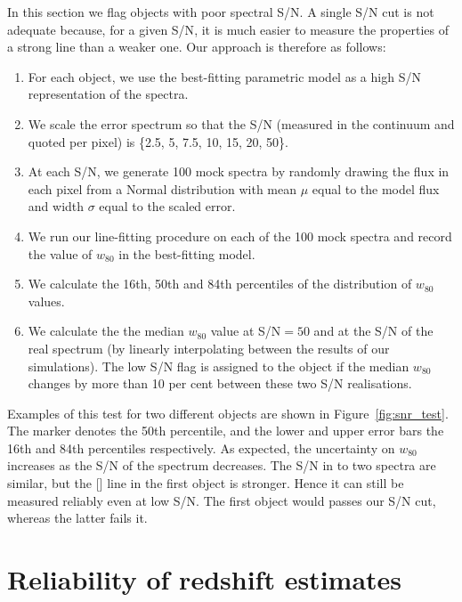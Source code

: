 In this section we flag objects with poor spectral \ac{S/N}. 
A single \ac{S/N} cut is not adequate because, for a given \ac{S/N}, it is much easier to measure the properties of a strong line than a weaker one. 
Our approach is therefore as follows:

\begin{enumerate}
\item For each object, we use the best-fitting parametric model as a high \ac{S/N} representation of the spectra. 
\item We scale the error spectrum so that the \ac{S/N} (measured in the continuum and quoted per pixel) is \{2.5, 5, 7.5, 10, 15, 20, 50\}.
\item At each \ac{S/N}, we generate 100 mock spectra by randomly drawing the flux in each pixel from a Normal distribution with mean $\mu$ equal to the model flux and width $\sigma$ equal to the scaled error. 
\item We run our line-fitting procedure on each of the 100 mock spectra and record the value of $w_{80}$ in the best-fitting model. 
\item We calculate the 16th, 50th and 84th percentiles of the distribution of $w_{80}$ values.
\item We calculate the the median $w_{80}$ value at \ac{S/N}$=50$ and at the \ac{S/N} of the real spectrum (by linearly interpolating between the results of our simulations). The low \ac{S/N} flag is assigned to the object if the median $w_{80}$ changes by more than 10 per cent between these two \ac{S/N} realisations. 
\end{enumerate}

Examples of this test for two different objects are shown in Figure~\ref{fig:snr_test}.
The marker denotes the 50th percentile, and the lower and upper error bars the 16th and 84th percentiles respectively. 
As expected, the uncertainty on $w_{80}$ increases as the \ac{S/N} of the spectrum decreases. 
The \ac{S/N} in to two spectra are similar, but the [] line in the  first object is stronger. 
Hence it can still be measured reliably even at low \ac{S/N}. 
The first object would passes our \ac{S/N} cut, whereas the latter fails it. 


\section{Reliability of redshift estimates}

